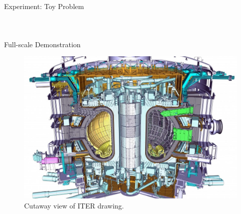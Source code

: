 \documentclass{beamer}
\begin{document}
\begin{frame}{Experiment: Toy Problem}
\begin{columns}
\begin{figure}
{\begin{tikzpicture}[every text node part/.style={align=center}]
	\end{tikzpicture}
        }
\end{figure}
\end{columns}
\end{frame}

\begin{frame}{Full-scale Demonstration}
\begin{figure}
	\centering
	\includegraphics[scale=0.3]{iter.jpg}
	\caption{Cutaway view of ITER drawing.}
\end{figure}

\end{frame}

\end{document}
